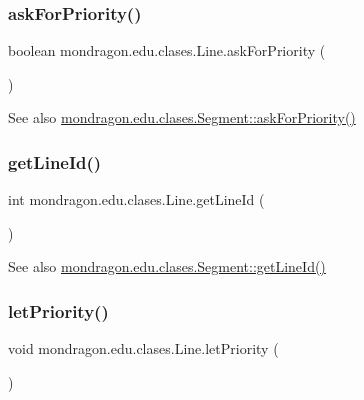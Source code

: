 \subsubsection{\texorpdfstring{askForPriority()}{askForPriority()}}
{\footnotesize\ttfamily boolean mondragon.\+edu.\+clases.\+Line.\+ask\+For\+Priority (\begin{DoxyParamCaption}{ }\end{DoxyParamCaption})\hspace{0.3cm}{\ttfamily [inline]}}

\begin{DoxySeeAlso}{See also}
\mbox{\hyperlink{classmondragon_1_1edu_1_1clases_1_1_segment_a0ee7818c127f5117a723b8fece868030}{mondragon.\+edu.\+clases.\+Segment\+::ask\+For\+Priority()}} 
\end{DoxySeeAlso}
\mbox{\label{classmondragon_1_1edu_1_1clases_1_1_line_ad7b2b31ddbd98c9dce53a6eb792b61ba}} 
\subsubsection{\texorpdfstring{getLineId()}{getLineId()}}
{\footnotesize\ttfamily int mondragon.\+edu.\+clases.\+Line.\+get\+Line\+Id (\begin{DoxyParamCaption}{ }\end{DoxyParamCaption})\hspace{0.3cm}{\ttfamily [inline]}}

\begin{DoxySeeAlso}{See also}
\mbox{\hyperlink{classmondragon_1_1edu_1_1clases_1_1_segment_af905b954e40e0c3d5b58673b03b972cc}{mondragon.\+edu.\+clases.\+Segment\+::get\+Line\+Id()}} 
\end{DoxySeeAlso}
\mbox{\label{classmondragon_1_1edu_1_1clases_1_1_line_a43a8aebb98a2d62a09c3bcb08f7dc553}} 
\subsubsection{\texorpdfstring{letPriority()}{letPriority()}}
{\footnotesize\ttfamily void mondragon.\+edu.\+clases.\+Line.\+let\+Priority (\begin{DoxyParamCaption}{ }\end{DoxyParamCaption})\hspace{0.3cm}{\ttfamily [inline]}}

